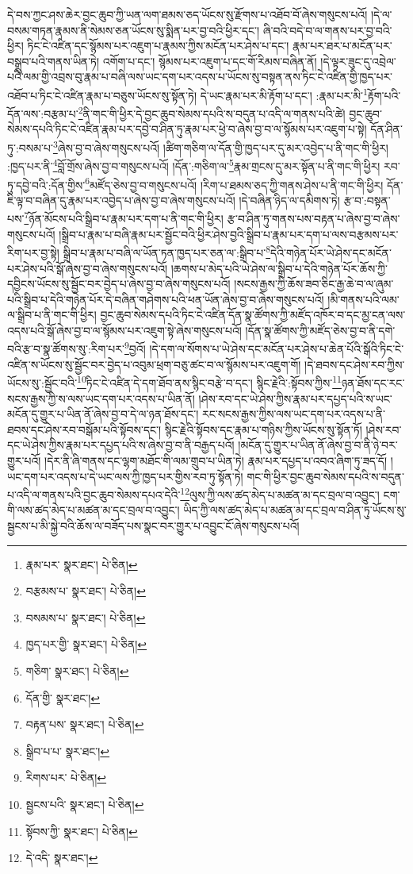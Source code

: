དེ་བས་ཀྱང་ཤས་ཆེར་བྱང་ཆུབ་ཀྱི་ཡན་ལག་ཐམས་ཅད་ཡོངས་སུ་རྫོགས་པ་འཐོབ་བོ་ཞེས་གསུངས་པའོ། །དེ་ལ་བསམ་གཏན་རྣམས་ནི་སེམས་ཅན་ཡོངས་སུ་སྨིན་པར་བྱ་བའི་ཕྱིར་དང་། ཞི་བའི་བདེ་བ་ལ་གནས་པར་བྱ་བའི་ཕྱིར། ཏིང་ངེ་འཛིན་དང་སྙོམས་པར་འཇུག་པ་རྣམས་ཀྱིས་མངོན་པར་ཤེས་པ་དང་། རྣམ་པར་ཐར་པ་མངོན་པར་བསྒྲུབ་པའི་གནས་ཡིན་ཏེ། འགོག་པ་དང་། སྙོམས་པར་འཇུག་པ་དང་གོ་རིམས་བཞིན་ནོ། །དེ་ལྟར་ཟུང་དུ་འབྲེལ་པའི་ལམ་གྱི་འབྲས་བུ་རྣམ་པ་བཞི་ལས་ཡང་དག་པར་འདས་པ་ཡོངས་སུ་བསྟན་ནས་ཏིང་ངེ་འཛིན་གྱི་ཁྱད་པར་འཐོབ་པ་ཏིང་ངེ་འཛིན་རྣམ་པ་བཅུས་ཡོངས་སུ་སྟོན་ཏེ། དེ་ཡང་རྣམ་པར་མི་རྟོག་པ་དང་། :རྣམ་པར་མི་\footnote{རྣམ་པར་  སྣར་ཐང་།  པེ་ཅིན། }རྟོག་པའི་དོན་ལས་:བརྩམ་པ་\footnote{བརྩམས་པ་  སྣར་ཐང་།  པེ་ཅིན། }ནི་གང་གི་ཕྱིར་དེ་བྱང་ཆུབ་སེམས་དཔའི་ས་བདུན་པ་འདི་ལ་གནས་པའི་ཚེ། བྱང་ཆུབ་སེམས་དཔའི་ཏིང་ངེ་འཛིན་རྣམ་པར་དབྱེ་བ་ཤིན་ཏུ་རྣམ་པར་ཕྱེ་བ་ཞེས་བྱ་བ་ལ་སྙོམས་པར་འཇུག་པ་སྟེ། དོན་ཤིན་ཏུ་:བསམ་པ་\footnote{བསམས་པ་  སྣར་ཐང་།  པེ་ཅིན། }ཞེས་བྱ་བ་ཞེས་གསུངས་པའོ། །ཚིག་གཅིག་ལ་དོན་གྱི་ཁྱད་པར་དུ་མར་འབྱེད་པ་ནི་གང་གི་ཕྱིར། :ཁྱད་པར་ནི་\footnote{ཁྱད་པར་གྱི་  སྣར་ཐང་།  པེ་ཅིན། }བློ་གྲོས་ཞེས་བྱ་བ་གསུངས་པའོ། །དོན་:གཅིག་ལ་\footnote{གཅིག་  སྣར་ཐང་།  པེ་ཅིན། }རྣམ་གྲངས་དུ་མར་སྟོན་པ་ནི་གང་གི་ཕྱིར། རབ་ཏུ་དབྱེ་བའི་:དོན་གྱིས་\footnote{དོན་གྱི་  སྣར་ཐང་། }མཛོད་ཅེས་བྱ་བ་གསུངས་པའོ། །རིག་པ་ཐམས་ཅད་ཀྱི་གནས་ཤེས་པ་ནི་གང་གི་ཕྱིར། དོན་ཇི་ལྟ་བ་བཞིན་དུ་རྣམ་པར་འབྱེད་པ་ཞེས་བྱ་བ་ཞེས་གསུངས་པའོ། །དེ་བཞིན་ཉིད་ལ་དམིགས་ཏེ། རྩ་བ་:བསྟན་པས་\footnote{བརྟན་པས་  སྣར་ཐང་།  པེ་ཅིན། }ཉོན་མོངས་པའི་སྒྲིབ་པ་རྣམ་པར་དག་པ་ནི་གང་གི་ཕྱིར། རྩ་བ་ཤིན་ཏུ་གནས་པས་བརྟན་པ་ཞེས་བྱ་བ་ཞེས་གསུངས་པའོ། །སྒྲིབ་པ་རྣམ་པ་བཞི་རྣམ་པར་སྦྱོང་བའི་ཕྱིར་ཤེས་བྱའི་སྒྲིབ་པ་རྣམ་པར་དག་པ་ལས་བརྩམས་པར་རིག་པར་བྱ་སྟེ། སྒྲིབ་པ་རྣམ་པ་བཞི་ལ་ཡོན་ཏན་ཁྱད་པར་ཅན་ལ་:སྒྲིབ་པ་\footnote{སྒྲིབ་པ་པ་  སྣར་ཐང་། }དེའི་གཉེན་པོར་ཡེ་ཤེས་དང་མངོན་པར་ཤེས་པའི་སྒོ་ཞེས་བྱ་བ་ཞེས་གསུངས་པའོ། །ཆགས་པ་མེད་པའི་ཡེ་ཤེས་ལ་སྒྲིབ་པ་དེའི་གཉེན་པོར་ཆོས་ཀྱི་དབྱིངས་ཡོངས་སུ་སྦྱོང་བར་བྱེད་པ་ཞེས་བྱ་བ་ཞེས་གསུངས་པའོ། །སངས་རྒྱས་ཀྱི་ཆོས་ཟབ་ཅིང་རྒྱ་ཆེ་བ་ལ་ཞུམ་པའི་སྒྲིབ་པ་དེའི་གཉེན་པོར་དེ་བཞིན་གཤེགས་པའི་ཕན་ཡོན་ཞེས་བྱ་བ་ཞེས་གསུངས་པའོ། །མི་གནས་པའི་ལམ་ལ་སྒྲིབ་པ་ནི་གང་གི་ཕྱིར། བྱང་ཆུབ་སེམས་དཔའི་ཏིང་ངེ་འཛིན་དོན་སྣ་ཚོགས་ཀྱི་མཛོད་འཁོར་བ་དང་མྱ་ངན་ལས་འདས་པའི་སྒོ་ཞེས་བྱ་བ་ལ་སྙོམས་པར་འཇུག་སྟེ་ཞེས་གསུངས་པའོ། །དོན་སྣ་ཚོགས་ཀྱི་མཛོད་ཅེས་བྱ་བ་ནི་དགེ་བའི་རྩ་བ་སྣ་ཚོགས་སུ་:རིག་པར་\footnote{རིགས་པར་  པེ་ཅིན། }བྱའོ། །དེ་དག་ལ་སོགས་པ་ཡེ་ཤེས་དང་མངོན་པར་ཤེས་པ་ཆེན་པོའི་སྒོའི་ཏིང་ངེ་འཛིན་ས་ཡོངས་སུ་སྦྱོང་བར་བྱེད་པ་འབུམ་ཕྲག་བཅུ་ཚང་བ་ལ་སྙོམས་པར་འཇུག་གོ། །དེ་ཐབས་དང་ཤེས་རབ་ཀྱིས་ཡོངས་སུ་:སྦྱོང་བའི་\footnote{སྦྱངས་པའི་  སྣར་ཐང་།  པེ་ཅིན། }ཏིང་ངེ་འཛིན་དེ་དག་ཐོབ་ནས་སྙིང་བརྩེ་བ་དང་། སྙིང་རྗེའི་:སྟོབས་ཀྱིས་\footnote{སྟོབས་ཀྱི་  སྣར་ཐང་།  པེ་ཅིན། }ཉན་ཐོས་དང་རང་སངས་རྒྱས་ཀྱི་ས་ལས་ཡང་དག་པར་འདས་པ་ཡིན་ནོ། །ཤེས་རབ་དང་ཡེ་ཤེས་ཀྱིས་རྣམ་པར་དཔྱད་པའི་ས་ཡང་མངོན་དུ་གྱུར་པ་ཡིན་ནོ་ཞེས་བྱ་བ་དེ་ལ་ཉན་ཐོས་དང་། རང་སངས་རྒྱས་ཀྱིས་ལས་ཡང་དག་པར་འདས་པ་ནི་ཐབས་དང་ཤེས་རབ་བསྒོམ་པའི་སྟོབས་དང་། སྙིང་རྗེའི་སྟོབས་དང་རྣམ་པ་གཉིས་ཀྱིས་ཡོངས་སུ་སྟོན་ཏོ། །ཤེས་རབ་དང་ཡེ་ཤེས་ཀྱིས་རྣམ་པར་དཔྱད་པའི་ས་ཞེས་བྱ་བ་ནི་བརྒྱད་པའོ། །མངོན་དུ་གྱུར་པ་ཡིན་ནོ་ཞེས་བྱ་བ་ནི་ཉེ་བར་གྱུར་པའོ། །དེར་ནི་ཞི་གནས་དང་ལྷག་མཐོང་གི་ལམ་གྲུབ་པ་ཡིན་ཏེ། རྣམ་པར་དཔྱད་པ་འབའ་ཞིག་ཏུ་ཟད་དོ། །ཡང་དག་པར་འདས་པ་དེ་ཡང་ལས་ཀྱི་ཁྱད་པར་གྱིས་རབ་ཏུ་སྟོན་ཏེ། གང་གི་ཕྱིར་བྱང་ཆུབ་སེམས་དཔའི་ས་བདུན་པ་འདི་ལ་གནས་པའི་བྱང་ཆུབ་སེམས་དཔའ་དེའི་\footnote{དེ་འདི་  སྣར་ཐང་། }ལུས་ཀྱི་ལས་ཚད་མེད་པ་མཚན་མ་དང་བྲལ་བ་འབྱུང་། ངག་གི་ལས་ཚད་མེད་པ་མཚན་མ་དང་བྲལ་བ་འབྱུང་། ཡིད་ཀྱི་ལས་ཚད་མེད་པ་མཚན་མ་དང་བྲལ་བ་ཤིན་ཏུ་ཡོངས་སུ་སྦྱངས་པ་མི་སྐྱེ་བའི་ཆོས་ལ་བཟོད་པས་སྣང་བར་གྱུར་པ་འབྱུང་ངོ་ཞེས་གསུངས་པའོ། 
